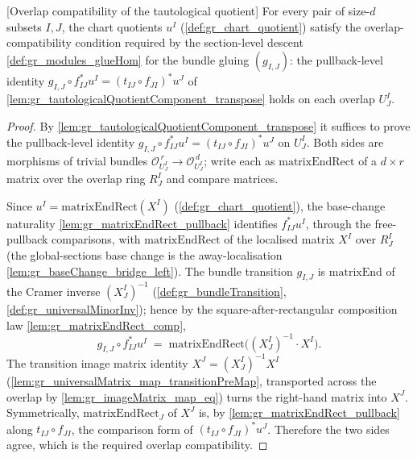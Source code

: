 \begin{lemma}

[Overlap compatibility of the tautological quotient]
  \label{lem:gr_tautologicalQuotient_overlap}
  For every pair of size-\(d\) subsets \(I, J\), the chart quotients \(u^I\)
  (\cref{def:gr_chart_quotient}) satisfy the overlap-compatibility condition required by the
  section-level descent \cref{def:gr_modules_glueHom} for the bundle gluing \((g_{I,J})\):
  the pullback-level identity \(g_{I,J} \circ f_{IJ}^{*} u^I = (t_{IJ}\circ f_{JI})^{*} u^J\)
  of \cref{lem:gr_tautologicalQuotientComponent_transpose} holds on each overlap \(U^I_J\).
\end{lemma}
\begin{proof}
  By \cref{lem:gr_tautologicalQuotientComponent_transpose} it suffices to prove the
  pullback-level identity \(g_{I,J} \circ f_{IJ}^{*} u^I = (t_{IJ}\circ f_{JI})^{*} u^J\) on
  \(U^I_J\). Both sides are morphisms of trivial bundles \(\mathcal{O}_{U^I_J}^{\,r} \to
  \mathcal{O}_{U^I_J}^{\,d}\); write each as \(\mathrm{matrixEndRect}\) of a \(d \times r\)
  matrix over the overlap ring \(R^I_J\) and compare matrices.

  Since \(u^I = \mathrm{matrixEndRect}(X^I)\) (\cref{def:gr_chart_quotient}), the
  base-change naturality \cref{lem:gr_matrixEndRect_pullback} identifies \(f_{IJ}^{*} u^I\),
  through the free-pullback comparisons, with \(\mathrm{matrixEndRect}\) of the localised
  matrix \(X^I\) over \(R^I_J\) (the global-sections base change is the away-localisation
  \cref{lem:gr_baseChange_bridge_left}). The bundle transition \(g_{I,J}\) is
  \(\mathrm{matrixEnd}\) of the Cramer inverse \((X^I_J)^{-1}\)
  (\cref{def:gr_bundleTransition}, \cref{def:gr_universalMinorInv}); hence by the
  square-after-rectangular composition law \cref{lem:gr_matrixEndRect_comp},
  \[
    g_{I,J} \circ f_{IJ}^{*} u^I
      \;=\; \mathrm{matrixEndRect}\bigl((X^I_J)^{-1} \cdot X^I\bigr).
  \]
  The transition image matrix identity \(X^J = (X^I_J)^{-1} X^I\)
  (\cref{lem:gr_universalMatrix_map_transitionPreMap}, transported across the overlap by
  \cref{lem:gr_imageMatrix_map_eq}) turns the right-hand matrix into \(X^J\). Symmetrically,
  \(\mathrm{matrixEndRect}_J\) of \(X^J\) is, by \cref{lem:gr_matrixEndRect_pullback} along
  \(t_{IJ}\circ f_{JI}\), the comparison form of \((t_{IJ}\circ f_{JI})^{*} u^J\). Therefore
  the two sides agree, which is the required overlap compatibility.
\end{proof}

